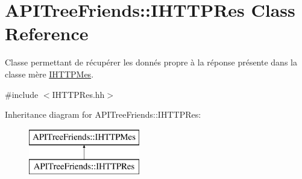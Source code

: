 \hypertarget{class_a_p_i_tree_friends_1_1_i_h_t_t_p_res}{}\section{A\+P\+I\+Tree\+Friends\+:\+:I\+H\+T\+T\+P\+Res Class Reference}
\label{class_a_p_i_tree_friends_1_1_i_h_t_t_p_res}


Classe permettant de récupérer les donnés propre à la réponse présente dans la classe mère \hyperlink{class_a_p_i_tree_friends_1_1_i_h_t_t_p_mes}{I\+H\+T\+T\+P\+Mes}.  




{\ttfamily \#include $<$I\+H\+T\+T\+P\+Res.\+hh$>$}

Inheritance diagram for A\+P\+I\+Tree\+Friends\+:\+:I\+H\+T\+T\+P\+Res\+:\begin{figure}[H]
\begin{center}
\leavevmode
\includegraphics[height=2.000000cm]{class_a_p_i_tree_friends_1_1_i_h_t_t_p_res}
\end{center}
\end{figure}
